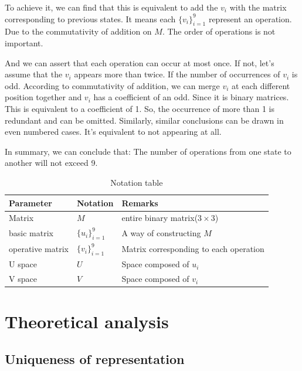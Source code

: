 \documentclass[
  manuscript=article,  %
  layout=preprint,  %
  year=20xx,
  volume=x,
]{extra/joas}
\begin{document}
\par To achieve it, we can find that this is equivalent to add the $v_i$ with the matrix corresponding to previous states.
It means each $\{v_i\}_{i=1}^9$ represent an operation. Due to the commutativity of addition on $M$. 
The order of operations is not important.
\par And we can assert that each operation can occur at most once.
If not, let's assume that the $v_i$ appears more than twice. If the number of occurrences of $v_i$ is odd.
According to commutativity of addition, we can merge $v_i$ at each different position together 
and $v_i$ has a coefficient of an odd. Since it is binary matrices. This is equivalent to a coefficient of 1.
So, the occurrence of more than 1 is redundant and can be omitted.
Similarly, similar conclusions can be drawn in even numbered cases. It's equivalent to not appearing at all.
\par In summary, we can conclude that: The number of operations from one state to another will not exceed 9.

\begin{table}[H]
  \centering
  \small
  \caption{Notation table}
  \label{tb:notation_table}
  \begin{tabular}{lll}
  \toprule
  \textbf{Parameter} & \textbf{Notation} & \textbf{Remarks} \\
  \midrule
  Matrix & $M$ &  entire binary matrix($3\times 3$) \\
  basic matrix & $\{ u_i\}_{i=1}^9$ & A way of constructing $M$ \\
  operative matrix & $\{ v_i\}_{i=1}^9$ & Matrix corresponding to each operation \\
  U space & $U$ & Space composed of $u_i$ \\
  V space & $V$ & Space composed of $v_i$\\
  \bottomrule
  \end{tabular}
\end{table}


\section{Theoretical analysis}

\subsection{Uniqueness of representation}
\end{document}
